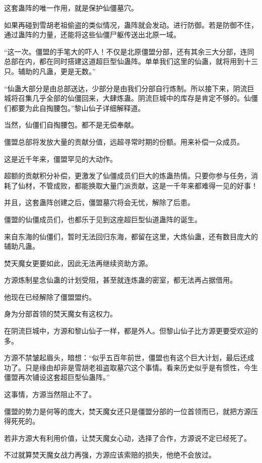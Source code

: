 \begin{this_body}
这套蛊阵的唯一作用，就是保护仙僵墓穴。

如果再碰到雪胡老祖偷盗的类似情况，蛊阵就会发动。进行防御。若是防御不住，通过蛊阵的力量，还能将这些仙僵尸躯传送出北原一域。

“这一次。僵盟的手笔大的吓人！不仅是北原僵盟分部，还有其余三大分部，连同总部在内，都在同时搭建这道超巨型仙蛊阵。单单我们这里的仙蛊，就将用到十三只。辅助的凡蛊，更是无数。”

“仙蛊大部分是由总部送达，少部分是由我们分部自行炼制。所以接下来，阴流巨城将召集几乎全部的仙僵回来，大肆炼蛊。阴流巨城中的库存是肯定不够的。仙僵们都要为此自掏腰包。”黎山仙子详细解释道。

当然，仙僵们自掏腰包。都不是无偿奉献。

僵盟总部将发放大量的贡献分值，远超寻常时期的份额。用来补偿一众成员。

这是近千年来，僵盟罕见的大动作。

超额的贡献积分补偿，更激发了仙僵成员们巨大的炼蛊热情。只要你参与任务，消耗了仙材，不管成败，都能换取大量门派贡献，这是一千年来都难得一见的好事！

并且，这套蛊阵创建之后，僵盟墓穴将会无忧，解除了后患。

僵盟的仙僵成员们，也都乐于见到这座超巨型仙道蛊阵的诞生。

来自东海的仙僵们，暂时无法回归东海，都留在这里，大炼仙蛊，还有数目庞大的辅助凡蛊。

焚天魔女更要如此，因此无法再继续资助方源。

方源炼制星念仙蛊的计划受阻，甚至就连炼蛊的密室，都无法再占据借用。

他现在已经解除了僵盟盟约。

身为分部首领的焚天魔女有这权力。

在阴流巨城中，方源和黎山仙子一样，都是外人。但黎山仙子比方源更要受欢迎的多。

方源不禁皱起眉头，暗想：“似乎五百年前世，僵盟也有这个巨大计划，最后还成功了。只是缘由却非是雪胡老祖盗取墓穴这个事情。看来历史似乎是有惯性，今生僵盟再次铺设这套超巨型仙蛊阵。”

这事情，方源当然阻止不了。

僵盟的势力是何等的庞大，焚天魔女还只是僵盟分部的一位首领而已，就把方源压得死死的。

若非方源大有利用价值，让焚天魔女心动，选择了合作，方源说不定已经死了。

不过就算焚天魔女战力再强，方源应该索赔的损失，他绝不会放过。


\end{this_body}
